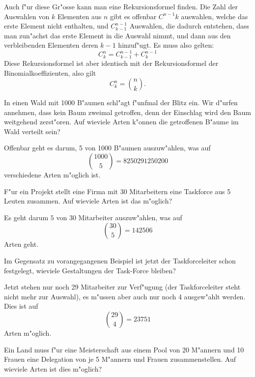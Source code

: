 Auch f"ur diese Gr"osse kann man eine Rekursionsformel finden.
Die Zahl der Auswahlen von $k$ Elementen aus $n$ gibt es
offenbar $C^{n-1}{k}$ auswahlen, welche das erste Element nicht
enthalten, und $C^{n-1}_{k-1}$ Auswahlen, die dadurch entstehen,
dass man zun"achst das erste Element in die Auswahl nimmt, und dann
aus den verbleibenden Elementen deren $k-1$ hinzuf"ugt. Es muss also
gelten:
\[
C^n_k=C^{n-1}_{k-1}+C^{n-1}_{k}
\]
Diese Rekursionsformel ist aber identisch mit der Rekursionsformel
der Binomialkoeffizienten, also gilt
\[
C^n_k=\binom{n}{k}.
\]

\begin{beispiele}
\item In einen Wald mit 1000 B"aumen schl"agt f"unfmal der Blitz ein.
Wir d"urfen annehmen, dass kein Baum zweimal getroffen, denn der
Einschlag wird den Baum weitgehend zerst"oren. Auf wieviele Arten
k"onnen die getroffenen B"aume im Wald verteilt sein?

\begin{loesung}
Offenbar geht es darum, 5 von 1000 B"aumen auszuw"ahlen, was 
auf
\[
\binom{1000}{5}=8250291250200
\]
verschiedene Arten m"oglich ist.
\end{loesung}

\item F"ur ein Projekt stellt eine Firma mit 30 Mitarbeitern eine Taskforce
aus 5 Leuten zusammen. Auf wieviele Arten ist das m"oglich?


\begin{loesung}
Es geht darum $5$ von $30$ Mitarbeiter auszuw"ahlen, was auf
\[
\binom{30}{5}=142506
\]
Arten geht.
\end{loesung}

\item Im Gegensatz zu vorangegangenen Beispiel ist jetzt der
Taskforceleiter schon festgelegt, wieviele Gestaltungen der
Task-Force bleiben?

\begin{loesung}
Jetzt stehen nur noch 29 Mitarbeiter zur Verf"ugung (der Taskforceleiter
steht nicht mehr zur Auswahl), es m"ussen aber auch nur noch 4 ausgew"ahlt
werden. Dies ist auf
\[
\binom{29}{4}=23751
\]
Arten m"oglich.
\end{loesung}

\item\label{meisterschaft}
Ein Land muss f"ur eine Meisterschaft aus einem Pool von
20 M"annern und 10 Frauen eine Delegation von je 5 M"annern
und Frauen zusammenstellen. Auf wieviele Arten ist dies m"oglich?


\end{beispiele}
